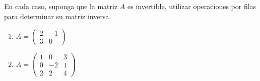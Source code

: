 \documentclass[a4,11pt]{aleph-notas}
\begin{document}
\begin{ejer}
    En cada caso, suponga que la matriz $A$ es invertible, utilizar operaciones por filas para determinar su matriz inversa.
    \begin{enumerate}
        \item $A = \begin{pmatrix}
                2 & -1\\ 3 & 0
            \end{pmatrix}$
        \item $A = \begin{pmatrix}
                1 & 0 & 3\\ 0 & -2 &  1 \\ 2 & 2 & 4
            \end{pmatrix}$
    \end{enumerate}
\end{ejer}
\end{document}
